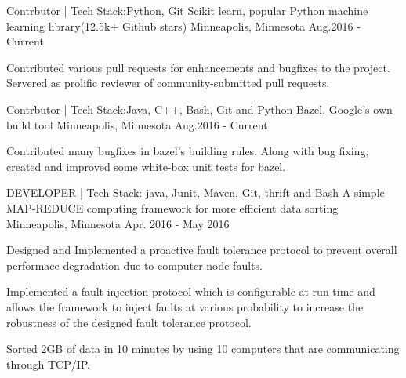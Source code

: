 \begin{cventries}
  \cventry
    { Contrbutor \enskip | \enskip Tech Stack:Python, Git} %
    {Scikit learn, popular Python machine learning library(12.5k+ Github stars)} %
    {Minneapolis, Minnesota} %
    {Aug.2016 - Current} %
    {
      \begin{cvitems} %
        \item {Contributed various pull requests for enhancements and bugfixes to the project. Servered as prolific reviewer of community-submitted pull requests. }
      \end{cvitems}
    }

  \cventry
    { Contrbutor \enskip | \enskip Tech Stack:Java, C++, Bash, Git and Python} %
    {Bazel, Google's own build tool} %
    {Minneapolis, Minnesota} %
    {Aug.2016 - Current} %
    {
      \begin{cvitems} %
        \item {Contributed many bugfixes in bazel's building rules. Along with bug fixing, created and improved some white-box unit tests for bazel.}
      \end{cvitems}
    }

  \cventry
    { DEVELOPER \enskip | \enskip Tech Stack: java, Junit, Maven, Git, thrift and Bash} %
    {A simple MAP-REDUCE computing framework for more efficient data sorting} %
    {Minneapolis, Minnesota} %
    {Apr. 2016 - May 2016} %
    {
      \begin{cvitems} %
        \item {Designed and Implemented a proactive fault tolerance protocol to prevent overall performace degradation due to computer node faults.}
        \item {Implemented a fault-injection protocol which is configurable at run time and allows the framework to inject faults at various probability to
increase the robustness of the designed fault tolerance protocol.}
        \item {Sorted 2GB of data in 10 minutes by using 10 computers that are communicating through TCP/IP.}
      \end{cvitems}
    }


\end{cventries}
